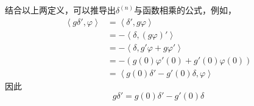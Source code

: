 \begin{example}
结合以上两定义，可以推导出$\delta^{(n)}$与函数相乘的公式，例如，
\begin{align*}
    \left\langle g\delta',\varphi\right\rangle & =\left\langle \delta',g\varphi\right\rangle\\
    & =-\left\langle\delta,(g\varphi)'\right\rangle              \\
    & =-\left\langle\delta,g'\varphi+g\varphi'\right\rangle      \\
    & =-(g(0)\varphi'(0)+g'(0)\varphi(0))             \\
    & =\left\langle g(0)\delta'-g'(0)\delta,\varphi\right\rangle
\end{align*}
因此
\[g\delta'=g(0)\delta'-g'(0)\delta\]
\end{example}

